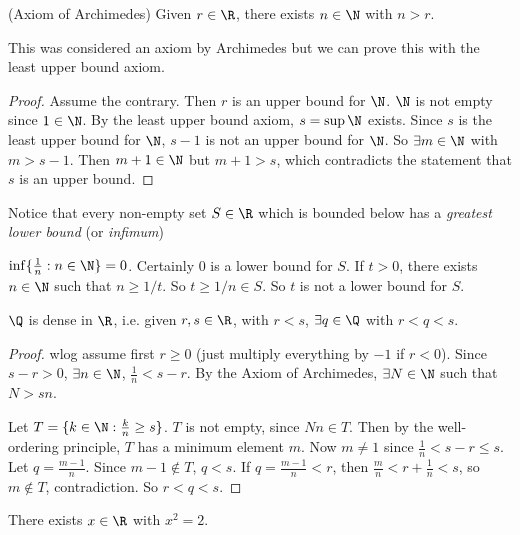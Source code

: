 \documentclass[a4paper]{article}
\begin{document}
  \begin{thm}
    (Axiom of Archimedes) Given $r\in \R$, there exists $n\in \N$ with $n > r$.
  \end{thm}

  \note This was considered an axiom by Archimedes but we can prove this with the least upper bound axiom.

  \begin{proof}
    Assume the contrary. Then $r$ is an upper bound for $\N$. $\N$ is not empty since $1\in \N$. By the least upper bound axiom, $s = \sup \N$ exists. Since $s$ is the least upper bound for $\N$, $s - 1$ is not an upper bound for $\N$. So $\exists m\in \N$ with $m > s - 1$. Then $m + 1\in \N$ but $m + 1 > s$, which contradicts the statement that $s$ is an upper bound.
  \end{proof}

  Notice that every non-empty set $S\in \R$ which is bounded below has a \emph{greatest lower bound} (or \emph{infimum})

  \begin{prop}
    $\inf\{\frac{1}{n}: n\in \N\} = 0$. 
    Certainly $0$ is a lower bound for $S$. If $t > 0$, there exists $n \in \N$ such that $n \geq 1/t$. So $t \geq 1/n\in S$. So $t$ is not a lower bound for $S$.
  \end{prop}

  \begin{thm}
    $\Q$ is dense in $\R$, i.e. given $r, s\in \R$, with $r < s$, $\exists q\in \Q$ with $r < q < s$.
  \end{thm}

  \begin{proof}
    wlog assume first $r \geq 0$ (just multiply everything by $-1$ if $r < 0$). Since $s - r > 0$, $\exists n\in \N$, $\frac{1}{n} < s - r$. By the Axiom of Archimedes, $\exists N\in \N$ such that $N > sn$.

    Let $T = \{k\in \N: \frac{k}{n}\geq s\}$. $T$ is not empty, since $Nn\in T$. Then by the well-ordering principle, $T$ has a minimum element $m$. Now $m\not= 1$ since $\frac{1}{n} < s - r \leq s$. Let $q = \frac{m - 1}{n}$. Since $m - 1\not\in T$, $q < s$. If $q =\frac{m - 1}{n}< r$, then $\frac{m}{n} < r + \frac{1}{n} < s$, so $m\not\in T$, contradiction. So $r < q < s$.
  \end{proof}

  \begin{thm}
    There exists $x\in \R$ with $x^2 = 2$.
  \end{thm}
\end{document}
